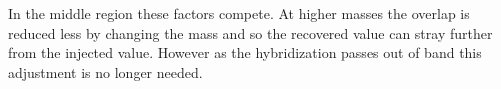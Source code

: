 In the middle region these factors compete.  At higher masses the
overlap is reduced less by changing the mass and so the recovered
value can stray further from the injected value.  However as the
hybridization passes out of band this adjustment is no longer needed.


\noindent {}





